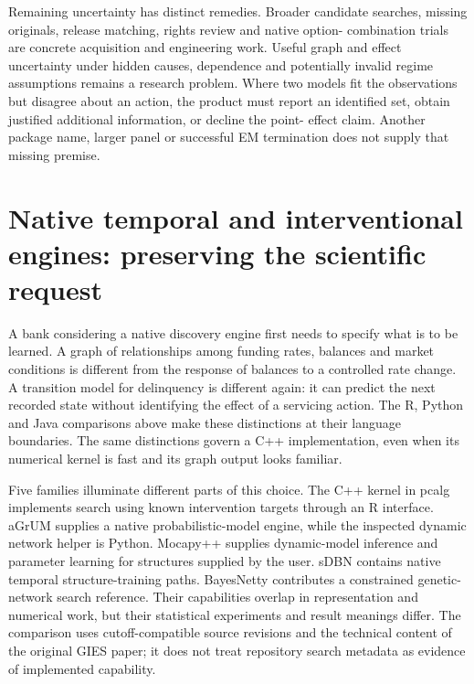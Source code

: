 Remaining uncertainty has distinct remedies. Broader candidate searches,
missing originals, release matching, rights review and native option-
combination trials are concrete acquisition and engineering work. Useful graph
and effect uncertainty under hidden causes, dependence and potentially invalid
regime assumptions remains a research problem. Where two models fit the
observations but disagree about an action, the product must report an
identified set, obtain justified additional information, or decline the point-
effect claim. Another package name, larger panel or successful EM termination
does not supply that missing premise.~\citep{exec15_javatemporal_design}
\label{exec15:java-temporal-end}


\section{Native temporal and interventional engines: preserving the scientific request}
\label{exec16:cxx-temporal}

A bank considering a native discovery engine first needs to specify what is
to be learned. A graph of relationships among funding rates, balances and
market conditions is different from the response of balances to a controlled
rate change. A transition model for delinquency is different again: it can
predict the next recorded state without identifying the effect of a servicing
action. The R, Python and Java comparisons above make these distinctions at
their language boundaries. The same distinctions govern a C++ implementation,
even when its numerical kernel is fast and its graph output looks familiar.

Five families illuminate different parts of this choice. The C++ kernel in
pcalg implements search using known intervention targets through an R interface.
aGrUM supplies a native probabilistic-model engine, while the inspected dynamic
network helper is Python. Mocapy++ supplies dynamic-model inference and parameter
learning for structures supplied by the user. sDBN contains native temporal
structure-training paths. BayesNetty contributes a constrained genetic-network
search reference. Their capabilities overlap in representation and numerical
work, but their statistical experiments and result meanings differ.
The comparison uses cutoff-compatible source revisions and the technical
content of the original GIES paper; it does not treat repository search
metadata as evidence of implemented capability. \citep{exec16_ct_pcalg,exec16_ct_agrum,exec16_ct_mocapy,exec16_ct_sdbn,exec16_ct_bayesnetty,exec14_pt_paper_gies}

